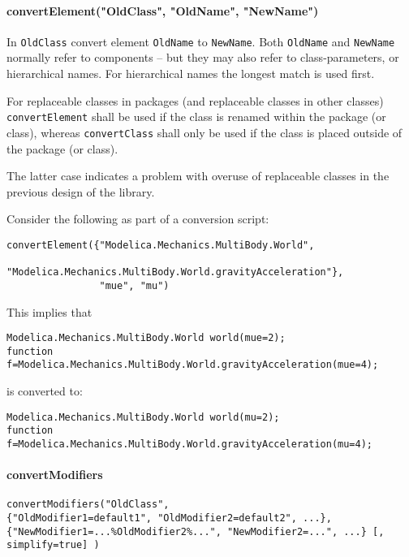 \paragraph*{convertElement("OldClass", "OldName", "NewName")}\label{convertelementoldclassoldnamenewname}

In \lstinline!OldClass! convert element \lstinline!OldName! to \lstinline!NewName!.
Both \lstinline!OldName! and \lstinline!NewName!
normally refer to components -- but they may also refer to
class-parameters, or hierarchical names. For hierarchical names the
longest match is used first.

For replaceable classes in packages (and replaceable classes in other classes) \lstinline!convertElement! shall
be used if the class is renamed within the package (or class), whereas \lstinline!convertClass! shall only be used if the class
is placed outside of the package (or class).

\begin{nonnormative}
The latter case indicates a problem with overuse of replaceable classes in the previous design of the library.
\end{nonnormative}

\begin{example}
Consider the following as part of a conversion script:
\begin{lstlisting}[language=modelica]
convertElement({"Modelica.Mechanics.MultiBody.World",
                "Modelica.Mechanics.MultiBody.World.gravityAcceleration"},
                "mue", "mu")
\end{lstlisting}
This implies that
\begin{lstlisting}[language=modelica]
Modelica.Mechanics.MultiBody.World world(mue=2);
function f=Modelica.Mechanics.MultiBody.World.gravityAcceleration(mue=4);
\end{lstlisting}
is converted to:
\begin{lstlisting}[language=modelica]
Modelica.Mechanics.MultiBody.World world(mu=2);
function f=Modelica.Mechanics.MultiBody.World.gravityAcceleration(mu=4);
\end{lstlisting}
\end{example}

\paragraph*{convertModifiers}\label{convertmodifiers}

\begin{lstlisting}[language=modelica]
convertModifiers("OldClass",
{"OldModifier1=default1", "OldModifier2=default2", ...},
{"NewModifier1=...%OldModifier2%...", "NewModifier2=...", ...} [, simplify=true] )
\end{lstlisting}

